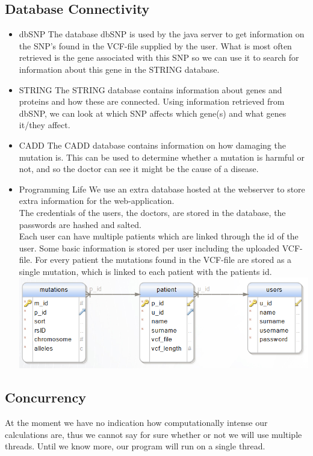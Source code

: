 	\subsection{Database Connectivity}
		\begin{itemize}
			\item dbSNP
				\subitem The database dbSNP is used by the java server to get information on the SNP's found in the VCF-file supplied by the user. What is most often retrieved is the gene associated with this SNP so we can use it to search for information about this gene in the STRING database.
			\item STRING
				\subitem The STRING database contains information about genes and proteins and how these are connected. Using information retrieved from dbSNP, we can look at which SNP affects which gene(s) and what genes it/they affect.
			\item CADD
				\subitem The CADD database contains information on how damaging the mutation is. This can be used to determine whether a mutation is harmful or not, and so the doctor can see it might be the cause of a disease.
			\item Programming Life
				\subitem We use an extra database hosted at the webserver to store extra information for the web-application. \\
				The credentials of the users, the doctors, are stored in the database, the passwords are hashed and salted.\\
				Each user can have multiple patients which are linked through the id of the user.
				Some basic information is stored per user including the uploaded VCF-file.
				For every patient the mutations found in the VCF-file are stored as a single mutation, which is linked to each patient with the patients id.\\
				\includegraphics[scale=0.55]{erd.png}
		\end{itemize}
	\subsection{Concurrency }
		At the moment we have no indication how computationally intense our calculations are, thus we cannot say for sure whether or not we will use multiple threads. Until we know more, our program will run on a single thread.
		
